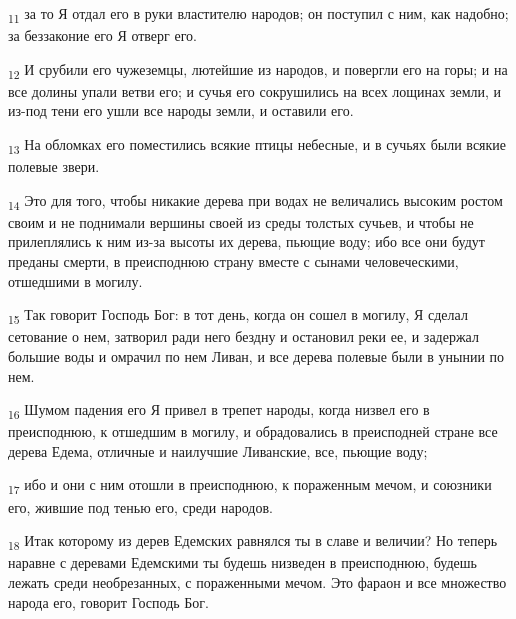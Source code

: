 \begin{tcolorbox}
\textsubscript{11} за то Я отдал его в руки властителю народов; он поступил с ним, как надобно; за беззаконие его Я отверг его.
\end{tcolorbox}
\begin{tcolorbox}
\textsubscript{12} И срубили его чужеземцы, лютейшие из народов, и повергли его на горы; и на все долины упали ветви его; и сучья его сокрушились на всех лощинах земли, и из-под тени его ушли все народы земли, и оставили его.
\end{tcolorbox}
\begin{tcolorbox}
\textsubscript{13} На обломках его поместились всякие птицы небесные, и в сучьях были всякие полевые звери.
\end{tcolorbox}
\begin{tcolorbox}
\textsubscript{14} Это для того, чтобы никакие дерева при водах не величались высоким ростом своим и не поднимали вершины своей из среды толстых сучьев, и чтобы не прилеплялись к ним из-за высоты их дерева, пьющие воду; ибо все они будут преданы смерти, в преисподнюю страну вместе с сынами человеческими, отшедшими в могилу.
\end{tcolorbox}
\begin{tcolorbox}
\textsubscript{15} Так говорит Господь Бог: в тот день, когда он сошел в могилу, Я сделал сетование о нем, затворил ради него бездну и остановил реки ее, и задержал большие воды и омрачил по нем Ливан, и все дерева полевые были в унынии по нем.
\end{tcolorbox}
\begin{tcolorbox}
\textsubscript{16} Шумом падения его Я привел в трепет народы, когда низвел его в преисподнюю, к отшедшим в могилу, и обрадовались в преисподней стране все дерева Едема, отличные и наилучшие Ливанские, все, пьющие воду;
\end{tcolorbox}
\begin{tcolorbox}
\textsubscript{17} ибо и они с ним отошли в преисподнюю, к пораженным мечом, и союзники его, жившие под тенью его, среди народов.
\end{tcolorbox}
\begin{tcolorbox}
\textsubscript{18} Итак которому из дерев Едемских равнялся ты в славе и величии? Но теперь наравне с деревами Едемскими ты будешь низведен в преисподнюю, будешь лежать среди необрезанных, с пораженными мечом. Это фараон и все множество народа его, говорит Господь Бог.
\end{tcolorbox}
